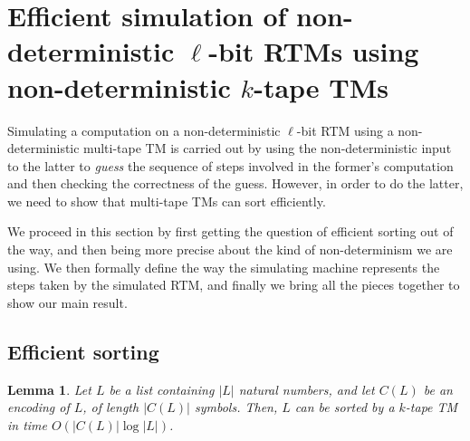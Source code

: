 \documentclass[english]{article}
\theoremstyle{plain}
\theoremstyle{definition}
\theoremstyle{plain}
\newtheorem{lem}[thm]{Lemma}
\begin{document}
\section{Efficient simulation of non-deterministic $\ell$-bit RTMs using non-deterministic $k$-tape TMs}

Simulating a computation on a non-deterministic $\ell$-bit RTM using a
non-deterministic multi-tape TM is carried out by using the
non-deterministic input to the latter to \emph{guess} the sequence of
steps involved in the former's computation and then checking the
correctness of the guess. However, in order to do the latter, we need
to show that multi-tape TMs can sort efficiently.

We proceed in this section by first getting the question of efficient
sorting out of the way, and then being more precise about the kind of
non-determinism we are using. We then formally define the way the
simulating machine represents the steps taken by the simulated RTM,
and finally we bring all the pieces together to show our main result.

\subsection{Efficient sorting}

\begin{lem}
  \label{efficient-sorting-lemma}
  Let $L$ be a list containing $|L|$ natural numbers, and let $C(L)$
  be an encoding of $L$, of length $|C(L)|$ symbols. Then, $L$ can be
  sorted by a $k$-tape TM in time $O(|C(L)|\log|L|)$.
\end{lem}
\end{document}
